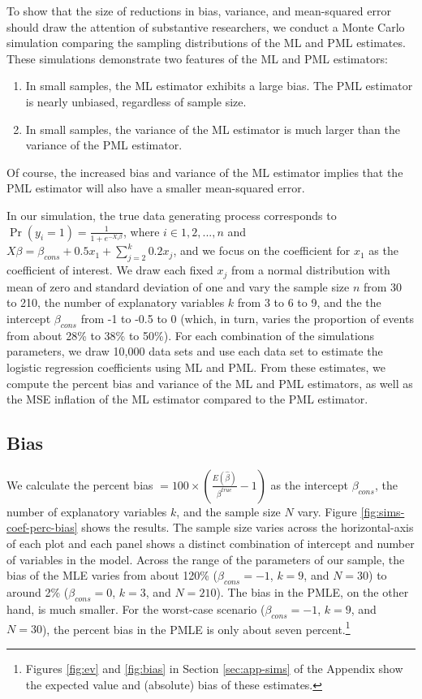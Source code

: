 \documentclass[12pt]{article}
\begin{document}
To show that the size of reductions in bias, variance, and mean-squared error should draw the attention of substantive researchers, we conduct a Monte Carlo simulation comparing the sampling distributions of the ML and PML estimates.
These simulations demonstrate two features of the ML and PML estimators:
\begin{enumerate}
\item In small samples, the ML estimator exhibits a large bias. The PML estimator is nearly unbiased, regardless of sample size.
\item In small samples, the variance of the ML estimator is much larger than the variance of the PML estimator.
\end{enumerate}
Of course, the increased bias and variance of the ML estimator implies that the PML estimator will also have a smaller mean-squared error.

In our simulation, the true data generating process corresponds to $\Pr(y_i = 1) = \frac{1}{1 + e^{-X_i \beta}}$, where $i \in 1, 2,..., n$ and $X \beta = \beta_{cons} + 0.5 x_1 + \sum_{j = 2}^k 0.2 x_j$, and we focus on the coefficient for $x_1$ as the coefficient of interest.
We draw each fixed $x_j$ from a normal distribution with mean of zero and standard deviation of one and vary the sample size $n$ from 30 to 210, the number of explanatory variables $k$ from 3 to 6 to 9, and the the intercept $\beta_{cons}$ from -1 to -0.5 to 0 (which, in turn, varies the proportion of events from about 28\% to 38\% to 50\%).
For each combination of the simulations parameters, we draw 10,000 data sets and use each data set to estimate the logistic regression coefficients using ML and PML. 
From these estimates, we compute the percent bias and variance of the ML and PML estimators, as well as the MSE inflation of the ML estimator compared to the PML estimator.

\subsection*{Bias}

We calculate the percent bias $= 100 \times \left(\frac{E(\hat{\beta})}{\beta^{true}} - 1 \right)$ as the intercept $\beta_{cons}$, the number of explanatory variables $k$, and the sample size $N$ vary.
Figure \ref{fig:sims-coef-perc-bias} shows the results.
The sample size varies across the horizontal-axis of each plot and each panel shows a distinct combination of intercept and number of variables in the model.
Across the range of the parameters of our sample, the bias of the MLE varies from about 120\% ($\beta_{cons} = -1$, $k = 9$, and $N = 30$) to around 2\% ($\beta_{cons} = 0$, $k = 3$, and $N = 210$).
The bias in the PMLE, on the other hand, is much smaller.
For the worst-case scenario ($\beta_{cons} = -1$, $k = 9$, and $N = 30$), the percent bias in the PMLE is only about seven percent.\footnote{Figures \ref{fig:ev} and \ref{fig:bias} in Section \ref{sec:app-sims} of the Appendix show the expected value and (absolute) bias of these estimates.}
\end{document}
